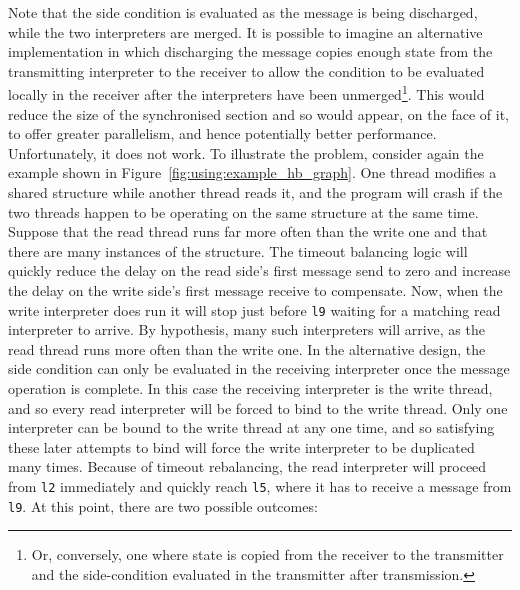Note that the side condition is evaluated as the message is being
discharged, while the two interpreters are merged.   It
is possible to imagine an alternative implementation in which
discharging the message copies enough state from the transmitting
interpreter to the receiver to allow the condition to be evaluated
locally in the receiver after the interpreters have been
unmerged\footnote{Or, conversely, one where state is copied from the
  receiver to the transmitter and the side-condition evaluated in the
  transmitter after transmission.}.  This would reduce the size of the
synchronised section and so would appear, on the face of it, to offer
greater parallelism, and hence potentially better performance.
Unfortunately, it does not work.  To illustrate the problem, consider
again the example shown in Figure~\ref{fig:using:example_hb_graph}.
One thread modifies a shared structure while another thread reads it,
and the program will crash if the two threads happen to be operating
on the same structure at the same time.  Suppose that the read thread
runs far more often than the write one and that there are many
instances of the structure.  The timeout balancing logic will quickly
reduce the delay on the read side's first message send to zero and
increase the delay on the write side's first message receive to
compensate.  Now, when the write interpreter does run it will stop
just before \verb|l9| waiting for a matching read interpreter to
arrive.   By hypothesis, many such
interpreters will arrive, as the read thread runs more often than the
write one.  In the alternative design, the side condition can only be
evaluated in the receiving interpreter once the message operation is
complete.  In this case the receiving interpreter is the write thread,
and so every read interpreter will be forced to bind to the write
thread.  Only one interpreter can be bound to the write thread at any
one time, and so satisfying these later attempts to bind will force
the write interpreter to be duplicated many times.  Because of timeout
rebalancing, the read interpreter will proceed from \verb|l2|
immediately and quickly reach \verb|l5|, where it has to receive a
message from \verb|l9|.  At this point, there are two possible
outcomes:

